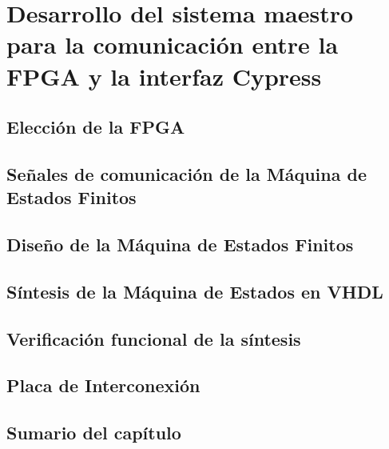 \chapter{Desarrollo del sistema maestro para la comunicación entre la FPGA y la interfaz Cypress}
	\label{cap:fpga}
	
%		
	\section{Elección de la FPGA}
		\label{mats:fpga}
		
	\section{Señales de comunicación de la Máquina de Estados Finitos}
		\label{fpga:sigs}
		
	\section{Diseño de la Máquina de Estados Finitos}
		
	\section{Síntesis de la Máquina de Estados en VHDL}
		
	\section{Verificación funcional de la síntesis}
		
	\section{Placa de Interconexión}
		
	\section{Sumario del capítulo}
		